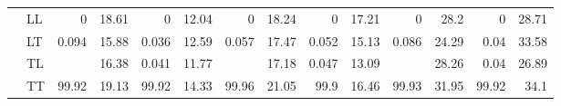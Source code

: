 \begin{table}[h]
{\begin{tabular}{llrrrrrrrrrrrr}
 & LL & \num{0} & \num{18.61} & \num{0} & \num{12.04} & \num{0} & \num{18.24} & \num{0} & \num{17.21} & \num{0} & \num{28.2} & \num{0} & \num{28.71} \\
 & LT & \num{0.094} & \num{15.88} & \num{0.036} & \num{12.59} & \num{0.057} & \num{17.47} & \num{0.052} & \num{15.13} & \num{0.086} & \num{24.29} & \num{0.04} & \num{33.58} \\
 & TL &  & \num{16.38} & \num{0.041} & \num{11.77} &  & \num{17.18} & \num{0.047} & \num{13.09} &  & \num{28.26} & \num{0.04} & \num{26.89} \\
 & TT & \num{99.92} & \num{19.13} & \num{99.92} & \num{14.33} & \num{99.96} & \num{21.05} & \num{99.9} & \num{16.46} & \num{99.93} & \num{31.95} & \num{99.92} & \num{34.1} \\
\bottomrule
\end{tabular}
}%
\end{table}